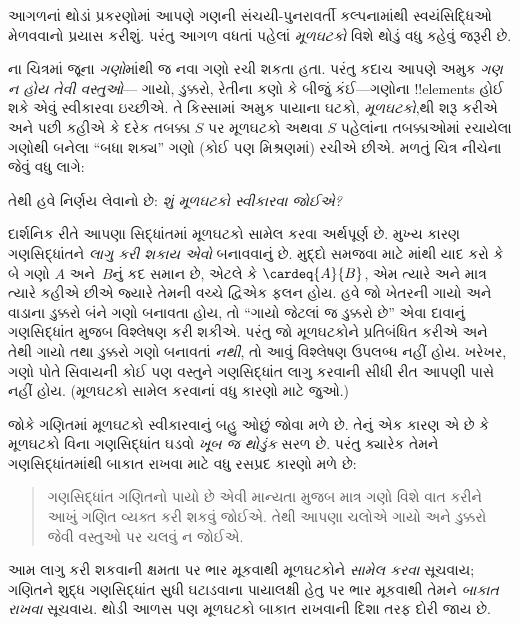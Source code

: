 \documentclass[../../../include/open-logic-section]{subfiles}
\begin{document}

આગળનાં થોડાં પ્રકરણોમાં આપણે ગણની સંચયી-પુનરાવર્તી કલ્પનામાંથી
સ્વયંસિદ્ધિઓ મેળવવાનો પ્રયાસ કરીશું. પરંતુ આગળ વધતાં પહેલાં
\emph{મૂળઘટકો} વિશે થોડું વધુ કહેવું જરૂરી છે.

ના ચિત્રમાં જૂના \emph{ગણો}માંથી જ નવા ગણો
રચી શકતા હતા. પરંતુ કદાચ આપણે અમુક \emph{ગણ ન હોય તેવી વસ્તુઓ}---
ગાયો, ડુક્કરો, રેતીના કણો કે બીજું કંઈ---ગણોના !!{element}s
હોઈ શકે એવું સ્વીકારવા ઇચ્છીએ. તે કિસ્સામાં અમુક પાયાના ઘટકો,
\emph{મૂળઘટકો},થી શરૂ કરીએ અને પછી કહીએ કે દરેક તબક્કા $S$ પર
મૂળઘટકો અથવા $S$ પહેલાંના તબક્કાઓમાં રચાયેલા ગણોથી બનેલા
``બધા શક્ય'' ગણો (કોઈ પણ મિશ્રણમાં) રચીએ છીએ.
મળતું ચિત્ર નીચેના જેવું વધુ લાગે:
\begin{center}
\end{center}
તેથી હવે નિર્ણય લેવાનો છે: \emph{શું મૂળઘટકો સ્વીકારવા જોઈએ?}

દાર્શનિક રીતે આપણા સિદ્ધાંતમાં મૂળઘટકો સામેલ કરવા અર્થપૂર્ણ છે.
મુખ્ય કારણ ગણસિદ્ધાંતને \emph{લાગુ કરી શકાય એવો} બનાવવાનું છે.
મુદ્દો સમજવા માટે માંથી યાદ કરો કે બે ગણો
$A$ અને~$B$નું કદ સમાન છે, એટલે કે $\cardeq{A}{B}$, એમ ત્યારે
અને માત્ર ત્યારે કહીએ છીએ જ્યારે તેમની વચ્ચે દ્વિએક ફલન હોય.
હવે જો ખેતરની ગાયો અને વાડાના ડુક્કરો બંને ગણો બનાવતા હોય, તો
``ગાયો જેટલાં જ ડુક્કરો છે'' એવા દાવાનું ગણસિદ્ધાંત મુજબ વિશ્લેષણ
કરી શકીએ. પરંતુ જો મૂળઘટકોને પ્રતિબંધિત કરીએ અને તેથી ગાયો તથા
ડુક્કરો ગણો બનાવતાં \emph{નથી}, તો આવું વિશ્લેષણ ઉપલબ્ધ નહીં હોય.
ખરેખર, ગણો પોતે સિવાયની કોઈ પણ વસ્તુને ગણસિદ્ધાંત લાગુ કરવાની
સીધી રીત આપણી પાસે નહીં હોય. (મૂળઘટકો સામેલ કરવાનાં વધુ કારણો
માટે \citealt[pp.~vi, 24, 50--1]{Potter2004} જુઓ.)

જોકે ગણિતમાં મૂળઘટકો સ્વીકારવાનું બહુ ઓછું જોવા મળે છે. તેનું
એક કારણ એ છે કે મૂળઘટકો વિના ગણસિદ્ધાંત ઘડવો \emph{ખૂબ જ થોડુંક}
સરળ છે. પરંતુ ક્યારેક તેમને ગણસિદ્ધાંતમાંથી બાકાત રાખવા માટે
વધુ રસપ્રદ કારણો મળે છે:
\begin{quote}
ગણસિદ્ધાંત ગણિતનો પાયો છે એવી માન્યતા મુજબ માત્ર ગણો વિશે વાત
કરીને આખું ગણિત વ્યક્ત કરી શકવું જોઈએ. તેથી આપણા ચલોએ ગાયો
અને ડુક્કરો જેવી વસ્તુઓ પર ચલવું ન જોઈએ.
\citep[p.~8]{Kunen1980}
\end{quote}
આમ લાગુ કરી શકવાની ક્ષમતા પર ભાર મૂકવાથી મૂળઘટકોને
\emph{સામેલ કરવા} સૂચવાય; ગણિતને શુદ્ધ ગણસિદ્ધાંત સુધી ઘટાડવાના
પાયાલક્ષી હેતુ પર ભાર મૂકવાથી તેમને \emph{બાકાત રાખવા} સૂચવાય.
થોડી આળસ પણ મૂળઘટકો બાકાત રાખવાની દિશા તરફ દોરી જાય છે.
\end{document}
